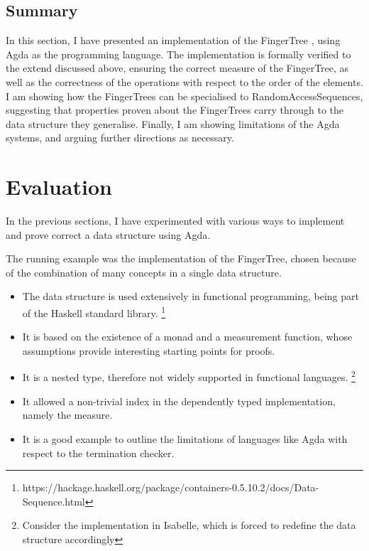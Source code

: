 \documentclass[12pt,twoside,notitlepage]{report}
\begin{document}
\section{Summary}
In this section, I have presented an implementation of the FingerTree \cite{fingertrees}, using Agda \cite{agdatutorial} as the programming language. The implementation is formally verified to the extend discussed above, ensuring the correct measure of the FingerTree, as well as the correctness of the operations with respect to the order of the elements. I am showing how the FingerTrees can be specialised to RandomAccessSequences, suggesting that properties proven about the FingerTrees carry through to the data structure they generalise. Finally, I am showing limitations of the Agda systems, and arguing further directions as necessary. 


\chapter{Evaluation}

In the previous sections, I have experimented with various ways to implement and prove correct a data structure using Agda. 

The running example was the implementation of the FingerTree, chosen because of the combination of many concepts in a single data structure.

\begin{itemize}
\item The data structure is used extensively in functional programming, being part of the Haskell standard library. \footnote{https://hackage.haskell.org/package/containers-0.5.10.2/docs/Data-Sequence.html}

\item It is based on the existence of a monad and a measurement function, whose assumptions provide interesting starting points for proofs.

\item It is a nested type, therefore not widely supported in functional languages. \footnote{Consider the implementation in Isabelle, which is forced to redefine the data structure accordingly}

\item It allowed a non-trivial index in the dependently typed implementation, namely the measure.

\item It is a good example to outline the limitations of languages like Agda with respect to the termination checker.
\end{itemize}
\end{document}

